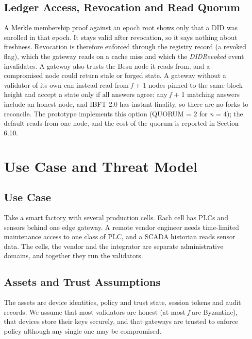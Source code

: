 \documentclass[a4paper,5p,times,twocolumn,number,sort&compress]{elsarticle}
\begin{document}
\subsection{Ledger Access, Revocation and Read Quorum}

A Merkle membership proof against an epoch root shows only that a DID was enrolled in that epoch. It stays valid after revocation, so it says nothing about freshness. Revocation is therefore enforced through the registry record (a revoked flag), which the gateway reads on a cache miss and which the \emph{DIDRevoked} event invalidates. A gateway also trusts the Besu node it reads from, and a compromised node could return stale or forged state. A gateway without a validator of its own can instead read from \emph{f} + 1 nodes pinned to the same block height and accept a state only if all answers agree: any \emph{f} + 1 matching answers include an honest node, and IBFT 2.0 has instant finality, so there are no forks to reconcile. The prototype implements this option (QUORUM = 2 for \emph{n} = 4); the default reads from one node, and the cost of the quorum is reported in Section 6.10.

\section{Use Case and Threat Model}

\subsection{Use Case}

Take a smart factory with several production cells. Each cell has PLCs and sensors behind one edge gateway. A remote vendor engineer needs time-limited maintenance access to one class of PLC, and a SCADA historian reads sensor data. The cells, the vendor and the integrator are separate administrative domains, and together they run the validators.

\subsection{Assets and Trust Assumptions}

The assets are device identities, policy and trust state, session tokens and audit records. We assume that most validators are honest (at most \emph{f} are Byzantine), that devices store their keys securely, and that gateways are trusted to enforce policy although any single one may be compromised.
\end{document}
